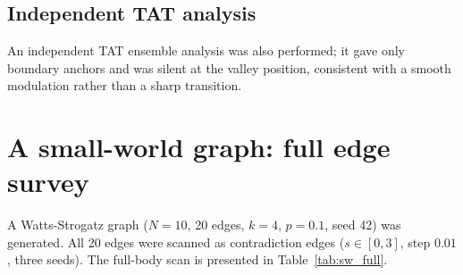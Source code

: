 \documentclass[aps,prb,reprint,superscriptaddress]{revtex4-2}
\begin{document}
\subsection{Independent TAT analysis}

An independent TAT ensemble analysis was also performed; it gave only boundary anchors and was silent at the valley position, consistent with a smooth modulation rather than a sharp transition.

\section{A small-world graph: full edge survey}

A Watts-Strogatz graph ($N=10$, 20 edges, $k=4$, $p=0.1$, seed 42) was generated. All 20 edges were scanned as contradiction edges ($s\in[0,3]$, step $0.01$, three seeds). The full-body scan is presented in Table~\ref{tab:sw_full}.
\end{document}
